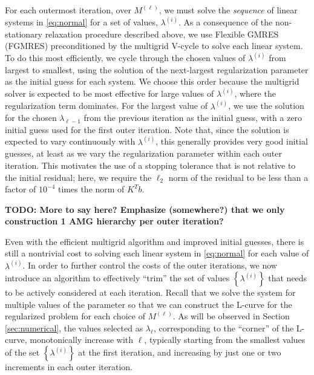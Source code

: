 
For each outermost iteration, over $M^{(\ell)}$, we must solve the
\textit{sequence} of linear systems in \eqref{eq:normal} for a set of
values, $\lambda^{(i)}$.  As a consequence of the non-stationary
relaxation procedure described above, we use Flexible GMRES
(FGMRES) \cite{YSaad_2003a} preconditioned by the multigrid V-cycle to
solve each linear system.  To do this most efficiently, we cycle
through the chosen values of $\lambda^{(i)}$ from largest to smallest,
using the solution of the next-largest regularization parameter as the
initial guess for each system.  We choose this order because the
multigrid solver is expected to be most effective for large values of
$\lambda^{(i)}$, where the regularization term dominates.  For the
largest value of $\lambda^{(i)}$, we use the solution for the chosen
$\lambda_{\ell-1}$ from the previous iteration as the initial guess,
with a zero initial guess used for the first outer iteration.  Note
that, since the solution is expected to vary continuously with
$\lambda^{(i)}$, this generally provides very good initial guesses, at
least as we vary the regularization parameter within each outer
iteration.  This motivates the use of a stopping tolerance that is not
relative to the initial residual; here, we require the $\ell_2$ norm
of the residual to be less than a factor of $10^{-4}$ times the norm
of $K^Tb$.

{\bf TODO: More to say here? Emphasize (somewhere?) that we only
  construction 1 AMG hierarchy per outer iteration?}

Even with the efficient multigrid algorithm and improved initial
guesses, there is still a nontrivial cost to solving each linear
system in \eqref{eq:normal} for each value of $\lambda^{(i)}$.  In
order to further control the costs of the outer iterations, we now
introduce an algorithm to effectively ``trim'' the set of values
$\left\{\lambda^{(i)}\right\}$ that needs to be actively considered at
each iteration.  Recall that we solve the system for multiple values
of the parameter so that we can construct the L-curve for the
regularized problem for each choice of $M^{(\ell)}$.  As will be
observed in Section \ref{sec:numerical}, the values selected as
$\lambda_\ell$, corresponding to the ``corner'' of the L-curve,
monotonically increase with $\ell$, typically starting from the
smallest values of the set $\left\{\lambda^{(i)}\right\}$ at the first
iteration, and increasing by just one or two increments in each outer
iteration.

